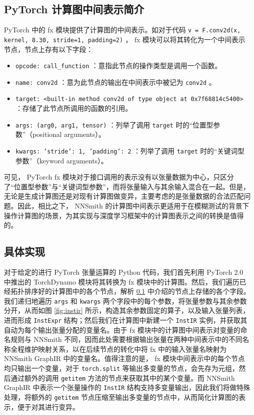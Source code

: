 \subsection{PyTorch 计算图中间表示简介}
\label{fxir}

PyTorch 中的 fx 模块提供了计算图的中间表示。如对于代码 \texttt{v = F.conv2d(x, kernel, 8.30, stride=1, padding=2)} ， fx 模块可以将其转化为一个中间表示节点，节点上存有以下字段：

\begin{itemize}
    \item \texttt{opcode: call\_function} ：意指此节点的操作类型是调用一个函数。
    \item \texttt{name: conv2d} ：意为此节点的输出在中间表示中被记为 \texttt{conv2d} 。
    \item \texttt{target: <built-in method conv2d of type object at 0x7f68814c5400>} ：存储了此节点所调用的函数的引用。
    \item \texttt{args: (arg0, arg1, tensor)} ：列举了调用 \texttt{target} 时的“位置型参数”（positional arguments）。
    \item \texttt{kwargs: {'stride': 1, 'padding': 2}} ：列举了调用 \texttt{target} 时的“关键词型参数”（keyword arguments）。
\end{itemize}

可见， PyTorch fx 模块对于接口调用的表示没有以张量数据为中心，只区分了“位置型参数”与“关键词型参数”，而将张量输入与其余输入混合在一起。但是，无论是生成计算图还是对现有计算图做变异，主要考虑的是张量数据的合法匹配问题。因此，相比之下， NNSmith 的计算图中间表示更适用于在模糊测试的背景下操作计算图的场景，为其实现与深度学习框架中的计算图表示之间的转换是值得的。

\subsection{具体实现}

对于给定的进行 PyTorch 张量运算的 Python 代码，我们首先利用 PyTorch 2.0 中推出的 TorchDynamo 模块将其转换为 fx 模块中的计算图。然后，我们遍历已经拓扑排序好的计算图中的各个节点，解析 \ref{fxir} 中介绍的节点上存储的各个字段。我们递归地遍历 \texttt{args} 和 \texttt{kwargs} 两个字段中的每个参数，将张量参数与其余参数分开，从而如图 \ref{fig:instir} 所示，构造其余参数固定的算子，以及输入张量列表，进而形成 \texttt{InstExpr} 结构；然后我们在计算图中新建一个 \texttt{InstIR} 实例，并获取其自动为每个输出张量分配的变量名。由于 fx 模块中的计算图中间表示对变量的命名规则与 NNSmith 不同，因而此处需要根据输出张量在两种中间表示中的不同名称全程维护映射关系，以在后续节点的转化中将 fx 中的输入张量名映射为 NNSmith GraphIR 中的变量名。值得注意的是， fx 模块中间表示中的每个节点均只输出一个变量，对于 \texttt{torch.split} 等输出多变量的节点，会先存为元组，然后通过额外的调用 \texttt{getitem} 方法的节点来获取其中的某个变量。而 NNSmith GraphIR 中表示一个张量操作的 \texttt{InstIR} 结构支持多变量输出，因此我们将做特殊处理，将额外的 \texttt{getitem} 节点压缩至输出多变量的节点中，从而简化计算图的表示，便于对其进行变异。

